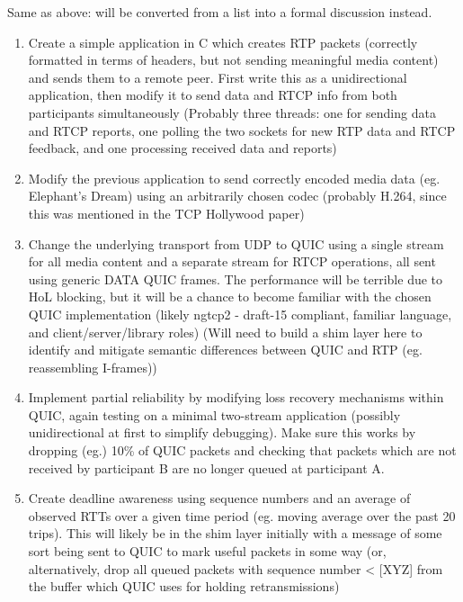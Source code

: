 \documentclass{mprop}
\begin{document}

Same as above: will be converted from a list into a formal discussion instead.

\begin{enumerate}
  \item Create a simple application in C which creates RTP packets (correctly formatted in terms 
  of headers, but not sending meaningful media content) and sends them to a remote peer. First 
  write this as a unidirectional application, then modify it to send data and RTCP info from both 
  participants simultaneously (Probably three threads: one for sending data and RTCP reports, one 
  polling the two sockets for new RTP data and RTCP feedback, and one processing received data 
  and reports)

  \item Modify the previous application to send correctly encoded media data (eg. Elephant's 
  Dream) using an arbitrarily chosen codec (probably H.264, since this was mentioned in the TCP 
  Hollywood paper)

  \item Change the underlying transport from UDP to QUIC using a single stream for all media 
  content and a separate stream for RTCP operations, all sent using generic DATA QUIC frames. The 
  performance will be terrible due to HoL blocking, but it will be a chance to become familiar 
  with the chosen QUIC implementation (likely ngtcp2 - draft-15 compliant, familiar language, and 
  client/server/library roles) (Will need to build a shim layer here to identify and mitigate 
  semantic differences between QUIC and RTP (eg. reassembling I-frames))

  \item Implement partial reliability by modifying loss recovery mechanisms within QUIC, again 
  testing on a minimal two-stream application (possibly unidirectional at first to simplify 
  debugging). Make sure this works by dropping (eg.) 10\% of QUIC packets and checking that 
  packets which are not received by participant B are no longer queued at participant A.

  \item Create deadline awareness using sequence numbers and an average of observed RTTs over a 
  given time period (eg. moving average over the past 20 trips). This will likely be in the shim 
  layer initially with a message of some sort being sent to QUIC to mark useful packets in some 
  way (or, alternatively, drop all queued packets with sequence number < [XYZ] from the buffer 
  which QUIC uses for holding retransmissions)


\end{enumerate}
\end{document}
